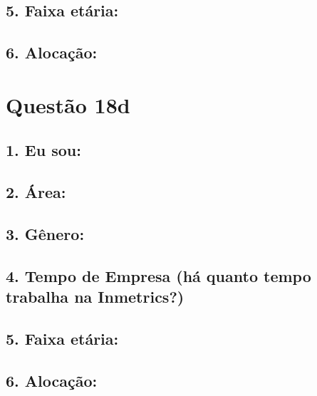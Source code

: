 \documentclass[]{book}
\begin{document}
\hypertarget{faixa-etaria-42}{%
\subsection{5. Faixa etária:}\label{faixa-etaria-42}}

\hypertarget{alocacao-42}{%
\subsection{6. Alocação:}\label{alocacao-42}}

\hypertarget{questao-18d}{%
\section{Questão 18d}\label{questao-18d}}

\hypertarget{eu-sou-43}{%
\subsection{1. Eu sou:}\label{eu-sou-43}}

\hypertarget{area-43}{%
\subsection{2. Área:}\label{area-43}}

\hypertarget{genero-43}{%
\subsection{3. Gênero:}\label{genero-43}}

\hypertarget{tempo-de-empresa-ha-quanto-tempo-trabalha-na-inmetrics-43}{%
\subsection{4. Tempo de Empresa (há quanto tempo trabalha na Inmetrics?)}\label{tempo-de-empresa-ha-quanto-tempo-trabalha-na-inmetrics-43}}

\hypertarget{faixa-etaria-43}{%
\subsection{5. Faixa etária:}\label{faixa-etaria-43}}

\hypertarget{alocacao-43}{%
\subsection{6. Alocação:}\label{alocacao-43}}
\end{document}
